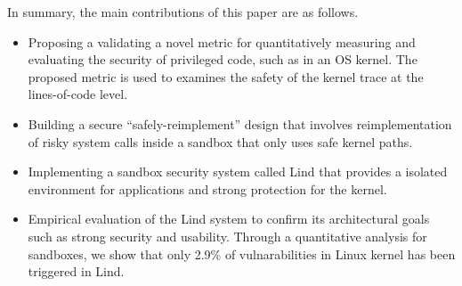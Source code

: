 
In summary, %
the main contributions of this paper are as follows. %
\begin{itemize}
\item %
Proposing a validating a novel metric for quantitatively measuring and
evaluating the security of privileged code, such as in an OS kernel.
The proposed metric is used to examines the safety of the kernel trace at the lines-of-code level.



\item %
Building a secure ``safely-reimplement'' design that
involves reimplementation of risky system calls inside a
sandbox that only uses safe kernel paths.

\item %

Implementing a sandbox security system called Lind
that provides a isolated environment for applications and strong protection for the kernel.

\item Empirical evaluation of the Lind system to confirm its architectural goals such as strong security and usability. Through a quantitative analysis for sandboxes, we show that only 2.9\% of vulnarabilities in Linux kernel has been triggered in Lind.


\end{itemize}

